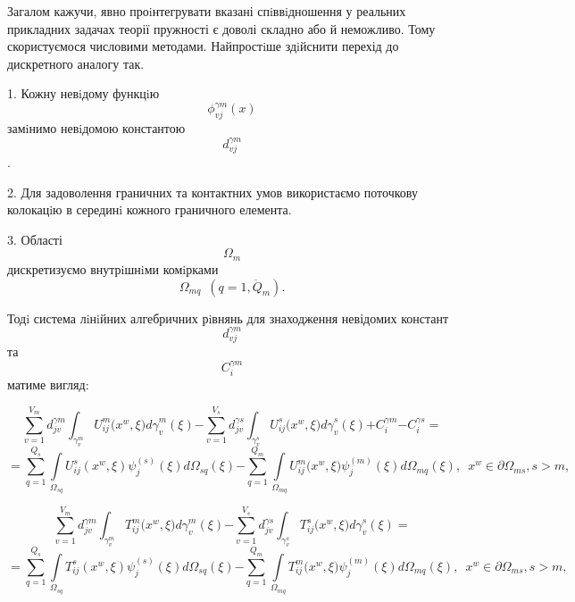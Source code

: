 Загалом кажучи, явно проiнте­гру­ва­ти вказані спiввiд­ношення у
реальних прикладних задачах теорії пружності є доволі складно або й
неможливо. Тому скористуємося числовими методами. Найпростiше здiйснити
перехід до дискретного аналогу так.

1. Кожну невiдому функцiю
\[{\phi_{\mathit{\text{vj}}}^{\mathit{\gamma m}}(x)}{}\] замiнимо
невiдомою константою \[d_{\mathit{\text{vj}}}^{\mathit{\gamma m}}{}\].

2. Для задоволення граничних та контактних умов використаємо поточкову
колокацiю в серединi кожного граничного елемента.

3. Області \[\Omega_{m}{}\] дискретизуємо внутрiшнiми комiрками
\[{\Omega_{\mathit{\text{mq}}}\mspace{9mu}({q = \overline{1,Q_{m}}})\text{.}}{}\]

Тодi система лiнiйних алгебричних рiвнянь для знаходження невідо­мих
констант \[d_{\mathit{\text{vj}}}^{\mathit{\gamma m}}{}\] та
\[C_{i}^{\mathit{\gamma m}}{}\] матиме вигляд:

\[{{\sum_{v = 1}^{V_{m}}d_{\mathit{\text{jv}}}^{\mathit{\gamma m}}}{\int_{\gamma_{v}^{m}}{U_{\mathit{\text{ij}}}^{m}{(x^{w}}{,\xi)\mathit{d\gamma}_{v}^{m}}{(\xi)}}}{{- {\sum_{v = 1}^{V_{s}}d_{\mathit{\text{jv}}}^{\mathit{\gamma s}}}}{\int_{\gamma_{v}^{s}}{U_{\mathit{\text{ij}}}^{s}{(x^{w}}{,\xi)\mathit{d\gamma}_{v}^{s}}{(\xi)}}}}{+ C_{i}^{\mathit{\gamma m}}}{- C_{i}^{\mathit{\gamma s}}} =}{}\]\[{{= {\sum\limits_{q = 1}^{Q_{s}}{\int\limits_{\Omega_{\mathit{\text{sq}}}}{U_{\mathit{\text{ij}}}^{s}(x^{w},\xi)\psi_{j}^{(s)}(\xi)d\Omega_{\mathit{\text{sq}}}(\xi)}}}}{- {\sum\limits_{q = 1}^{Q_{m}}{\int\limits_{\Omega_{\mathit{\text{mq}}}}{U_{\mathit{\text{ij}}}^{m}{(x^{w}}{,\xi)\psi_{j}^{(m)}}{(\xi)d\Omega_{\mathit{\text{mq}}}}{(\xi),}}}}}{\mspace{9mu} x^{w}}{\in\partial\Omega_{\mathit{\text{ms}}}}{,{s > m},}}{}\]

\[{{\sum_{v = 1}^{V_{m}}d_{\mathit{\text{jv}}}^{\mathit{\gamma m}}}{\int_{\gamma_{v}^{m}}{T_{\mathit{\text{ij}}}^{m}{(x^{w}}{,\xi)\mathit{d\gamma}_{v}^{m}}{(\xi)}}}{{- {\sum_{v = 1}^{V_{s}}d_{\mathit{\text{jv}}}^{\mathit{\gamma s}}}}{\int_{\gamma_{v}^{s}}{T_{\mathit{\text{ij}}}^{s}{(x^{w}}{,\xi)\mathit{d\gamma}_{v}^{s}}{(\xi)}}}} =}{}\]\[{{= {\sum\limits_{q = 1}^{Q_{s}}{\int\limits_{\Omega_{\mathit{\text{sq}}}}{T_{\mathit{\text{ij}}}^{s}(x^{w},\xi)\psi_{j}^{(s)}(\xi)d\Omega_{\mathit{\text{sq}}}(\xi)}}}}{- {\sum\limits_{q = 1}^{Q_{m}}{\int\limits_{\Omega_{\mathit{\text{mq}}}}{T_{\mathit{\text{ij}}}^{m}{(x^{w}}{,\xi)\psi_{j}^{(m)}}{(\xi)d\Omega_{\mathit{\text{mq}}}}{(\xi),}}}}}{\mspace{9mu} x^{w}}{\in\partial\Omega_{\mathit{\text{ms}}}}{,{s > m},}}{}\]

